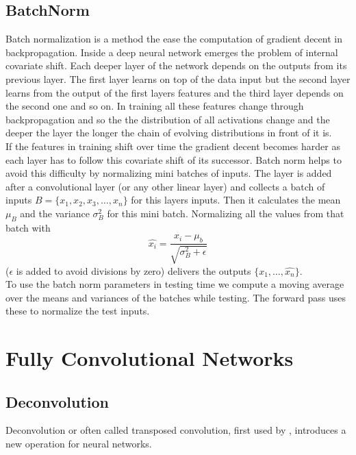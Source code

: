 \subsection{BatchNorm} %
\label{sub:conepts:nn:batchnorm}
Batch normalization \citep{ioffe_batch_2015} is a method the ease the computation of gradient decent in backpropagation. Inside a deep neural network emerges the problem of internal covariate shift. Each deeper layer of the network depends on the outputs from its previous layer. The first layer learns on top of the data input but the second layer learns from the output of the first layers features and the third layer depends on the second one and so on. In training all these features change through backpropagation and so the the distribution of all activations change and the deeper the layer the longer the chain of evolving distributions in front of it is.\\
If the features in training shift over time the gradient decent becomes harder as each layer has to follow this covariate shift of its successor. Batch norm helps to avoid this difficulty by normalizing mini batches of inputs. The layer is added after a convolutional layer (or any other linear layer) and collects a batch of inputs $B = \{x_1, x_2, x_3, \dots, x_n\}$ for this layers inputs. Then it calculates the mean $\mu_B$ and the variance $\sigma_B^2$ for this mini batch. Normalizing all the values from that batch  with $$\hat{x_i} = \frac{x_i - \mu_b}{\sqrt{\sigma_B^2 + \epsilon}}$$ ($\epsilon$ is added to avoid divisions by zero) delivers the outputs $\{\hat{x_1},\dots,\hat{x_n}\}$.\\
To use the batch norm parameters in testing time we compute a moving average over the means and variances of the batches while testing. The forward pass uses these to normalize the test inputs.

\section{Fully Convolutional Networks}
\label{sec:concepts:fcn}

\subsection{Deconvolution} %
\label{sub:conepts:fcn:deconv}
Deconvolution or often called transposed convolution, first used by \citet{zeiler_deconvolutional_2010}, introduces a new operation for neural networks.

